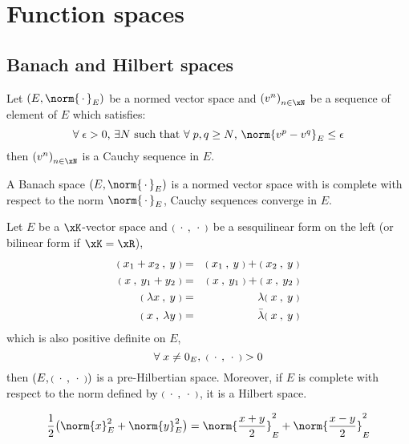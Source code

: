 
\chapter{Function spaces}

\section{Banach and Hilbert spaces}

\begin{dfntn} Let $(E, \norm{\xDot}_E)$ be a normed vector space and $\seqn{v}$ be a sequence of element of $E$ which satisfies:
\begin{equation*}
\mbox{$\forany \epsilon > 0$, $\exists N$ such that $\forany p, q \geq N$, $\norm{v^p - v^q}_E \leq \epsilon$}
\end{equation*}
then $\seqn{v}$ is a Cauchy sequence in $E$.
\end{dfntn}

\medskip
\begin{dfntn}
A Banach space $(E,\norm{\xDot}_E)$ is a normed vector space with is complete with respect to the norm $\norm{\xDot}_E$, \ie Cauchy sequences converge in $E$.
\end{dfntn}

\medskip
\begin{dfntn}
Let $E$ be a $\xK$-vector space and $\Inner{\xDot}{\xDot}$ be a sesquilinear  form  on the left (or bilinear form if $\xK = \xR$),
\begin{eqnarray*}
\Inner{x_1 + x_2}{y} &=& \Inner{x_1}{y} + \Inner{x_2}{y}\\
\Inner{x}{y_1 + y_2} &=& \Inner{x}{y_1} + \Inner{x}{y_2}\\
\Inner{\lambda x}{y} &=& \lambda\Inner{x}{y}\\
\Inner{x}{\lambda y} &=& \bar\lambda\Inner{x}{y}
\end{eqnarray*}
which is also positive definite on $E$,
\begin{equation*}
\forany x \not = 0_E,\;\Inner{\xDot}{\xDot} > 0
\end{equation*}
then $(E,\Inner{\xDot}{\xDot})$ is a pre-Hilbertian space.
Moreover, if $E$ is complete with respect to the norm defined by $\Inner{\xDot}{\xDot}$, it is a Hilbert space.
\end{dfntn}

\medskip
\begin{dfntn}
\begin{equation*}
\dfrac{1}{2}\bigl(\norm{x}^2_E + \norm{y}^2_E\bigr) = \norm{\dfrac{x + y}{2}}^2_E + \norm{\dfrac{x - y}{2}}^2_E
\end{equation*}
\end{dfntn}


